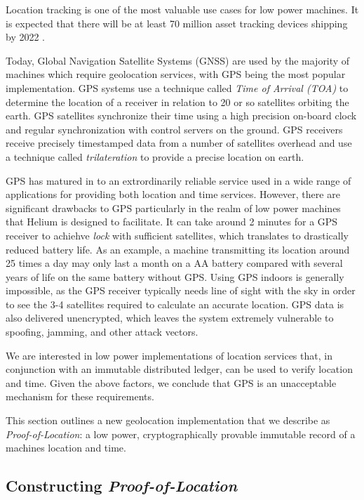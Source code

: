 \documentclass[10pt, nonatbib, nocopyrightspace, reprint]{sigplanconf}
\begin{document}
Location tracking is one of the most valuable use cases for low power machines. It is expected that there will be at least 70 million asset tracking devices shipping by 2022 \cite{mobile-experts}.

Today, Global Navigation Satellite Systems (GNSS) are used by the majority of machines which require geolocation services, with GPS being the most popular implementation. GPS systems use a technique called \emph{Time of Arrival (TOA)} to determine the location of a receiver in relation to 20 or so satellites orbiting the earth. GPS satellites synchronize their time using a high precision on-board clock and regular synchronization with control servers on the ground. GPS receivers receive precisely timestamped data from a number of satellites overhead and use a technique called \emph{trilateration} to provide a precise location on earth.

GPS has matured in to an extrordinarily reliable service used in a wide range of applications for providing both location and time services. However, there are significant drawbacks to GPS particularly in the realm of low power machines that Helium is designed to facilitate. It can take around 2 minutes for a GPS receiver to achiehve \emph{lock} with sufficient satellites, which translates to drastically reduced battery life. As an example, a machine transmitting its location around 25 times a day may only last a month on a AA battery compared with several years of life on the same battery without GPS. Using GPS indoors is generally impossible, as the GPS receiver typically needs line of sight with the sky in order to see the 3-4 satellites required to calculate an accurate location. GPS data is also delivered unencrypted, which leaves the system extremely vulnerable to spoofing, jamming, and other attack vectors.

We are interested in low power implementations of location services that, in conjunction with an immutable distributed ledger, can be used to verify location and time. Given the above factors, we conclude that GPS is an unacceptable mechanism for these requirements.

This section outlines a new geolocation implementation that we describe as \emph{Proof-of-Location}: a low power, cryptographically provable immutable record of a machines location and time.

\subsection{Constructing \emph{Proof-of-Location}}
\end{document}
